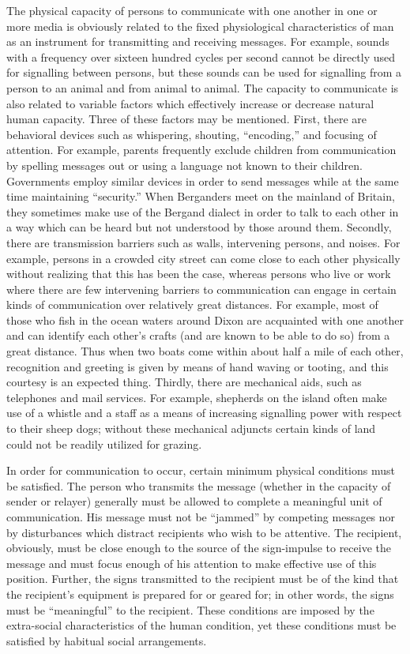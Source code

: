 \documentclass[twoside,symmetric,nobib,justified]{tufte-book}
\begin{document}
The physical capacity of persons to communicate with one another in one
or more media is obviously related to the fixed physiological
characteristics of man as an instrument for transmitting and receiving
messages. For example, sounds with a frequency over sixteen hundred
cycles per second cannot be directly used for signalling between
persons, but these sounds can be used for signalling from a person to an
animal and from animal to animal. The capacity to communicate is also
related to variable factors which effectively increase or decrease
natural human capacity. Three of these factors may be mentioned. First,
there are behavioral devices such as whispering, shouting, ``encoding,''
and focusing of attention. For example, parents frequently exclude
children from communication by spelling messages out or using a language
not known to their children. Governments employ similar devices in order
to send messages while at the same time maintaining ``security.'' When
Berganders meet on the mainland of Britain, they sometimes make use of
the Bergand dialect in order to talk to each other in a way which can be
heard but not understood by those around them. Secondly, there are
transmission barriers such as walls, intervening persons, and noises.
For example, persons in a crowded city street can come close to each
other physically without realizing that this has been the case, whereas
persons who live or work where there are few intervening barriers to
communication can engage in certain kinds of communication over
relatively great distances. For example, most of those who fish in the
ocean waters around Dixon are acquainted with one another and can
identify each other's crafts (and are known to be able to do so) from a
great distance. Thus when two boats come within about half a mile of
each other, recognition and greeting is given by means of hand waving or
tooting, and this courtesy is an expected thing. Thirdly, there are
mechanical aids, such as telephones and mail services. For example,
shepherds on the island often make use of a whistle and a staff as a
means of increasing signalling power with respect to their sheep dogs;
without these mechanical adjuncts certain kinds of land could not be
readily utilized for grazing.

In order for communication to occur, certain minimum physical conditions
must be satisfied. The person who transmits the message (whether in the
capacity of sender or relayer) generally must be allowed to complete a
meaningful unit of communication. His message must not be ``jammed'' by
competing messages nor by disturbances which distract recipients who
wish to be attentive. The recipient, obviously, must be close enough to
the source of the sign-impulse to receive the message and must focus
enough of his attention to make effective use of this position. Further,
the signs transmitted to the recipient must be of the kind that the
recipient's equipment is prepared for or geared for; in other words, the
signs must be ``meaningful'' to the recipient. These conditions are
imposed by the extra-social characteristics of the human condition, yet
these conditions must be satisfied by habitual social arrangements.
\end{document}
